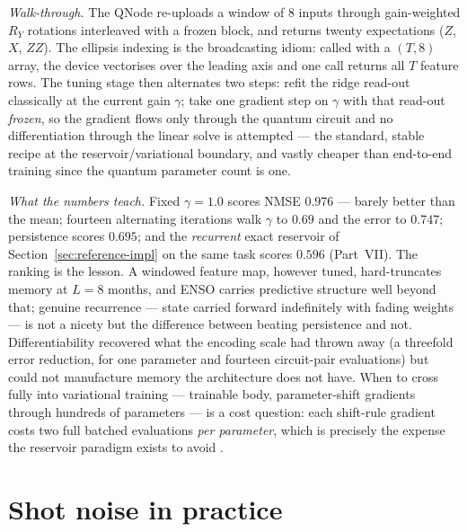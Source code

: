 \begin{strip}

\end{strip}

\emph{Walk-through.} The QNode re-uploads a window of $8$ inputs through
gain-weighted $R_Y$ rotations interleaved with a frozen
 block, and returns twenty expectations
($Z$, $X$, $ZZ$). The ellipsis indexing  is the
broadcasting idiom: called with a $(T,8)$ array, the device vectorises over
the leading axis and one call returns all $T$ feature rows. The tuning stage
then alternates two steps: refit the ridge read-out classically at the
current gain $\gamma$; take one gradient step on $\gamma$ with that read-out
\emph{frozen}, so the gradient flows only through the quantum circuit and no
differentiation through the linear solve is attempted --- the standard, stable
recipe at the reservoir/variational boundary, and vastly cheaper than
end-to-end training since the quantum parameter count is one.

\emph{What the numbers teach.} Fixed $\gamma=1.0$ scores NMSE $0.976$ ---
barely better than the mean; fourteen alternating iterations walk $\gamma$
to $0.69$ and the error to $0.747$; persistence scores $0.695$; and the
\emph{recurrent} exact reservoir of Section~\ref{sec:reference-impl} on the
same task scores $0.596$ (Part~VII). The ranking is the lesson. A windowed
feature map, however tuned, hard-truncates memory at $L=8$ months, and ENSO
carries predictive structure well beyond that; genuine recurrence --- state
carried forward indefinitely with fading weights --- is not a nicety but the
difference between beating persistence and not. Differentiability recovered
what the encoding scale had thrown away (a threefold error reduction, for
one parameter and fourteen circuit-pair evaluations) but could not
manufacture memory the architecture does not have. When to cross fully into
variational training --- trainable body, parameter-shift gradients through
hundreds of parameters --- is a cost question: each shift-rule gradient costs
two full batched evaluations \emph{per parameter}, which is precisely the
expense the reservoir paradigm exists to avoid
\citep{mitarai2018quantum,cerezo2021variational}.

\section{Shot noise in practice}
\label{sec:shot-practice}

